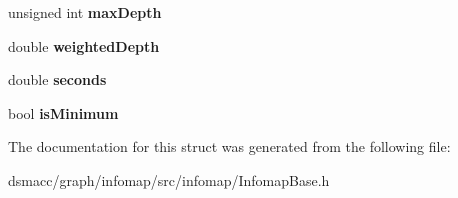 \begin{DoxyCompactItemize}
unsigned int {\bfseries max\+Depth}
\item 
\mbox{\label{structPerIterationStats_ad9a76b5f7fa801c2926fc13b3423611c}} 
double {\bfseries weighted\+Depth}
\item 
\mbox{\label{structPerIterationStats_ad21d89ac39db4aada91a6b7ee77d2e2d}} 
double {\bfseries seconds}
\item 
\mbox{\label{structPerIterationStats_a7a8e02a98cab94a0151771209da2619a}} 
bool {\bfseries is\+Minimum}
\end{DoxyCompactItemize}


The documentation for this struct was generated from the following file\+:\begin{DoxyCompactItemize}
\item 
dsmacc/graph/infomap/src/infomap/Infomap\+Base.\+h\end{DoxyCompactItemize}
